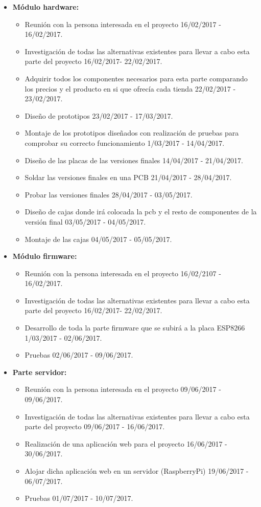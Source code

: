 \begin{itemize}
	\item\textbf{Módulo hardware:}
		\begin{itemize}
			\item Reunión con la persona interesada en el proyecto 16/02/2017 - 16/02/2017. 
			\item Investigación de todas las alternativas existentes para llevar a cabo esta parte del proyecto 16/02/2017- 22/02/2017.
			\item Adquirir todos los componentes necesarios para esta parte comparando los precios y el producto en si que ofrecía cada tienda 22/02/2017 - 23/02/2017.
			\item Diseño de prototipos 23/02/2017 - 17/03/2017.
			\item Montaje de los prototipos diseñados con realización de pruebas para comprobar su correcto funcionamiento 1/03/2017 - 14/04/2017.
			\item Diseño de las placas de las versiones finales 14/04/2017 - 21/04/2017.
			\item Soldar las versiones finales en una PCB 21/04/2017 - 28/04/2017.
			\item Probar las versiones finales 28/04/2017 - 03/05/2017.
			\item Diseño de cajas donde irá colocada la pcb y el resto de componentes de la versión final 03/05/2017 - 04/05/2017.
			\item Montaje de las cajas 04/05/2017 - 05/05/2017.
		\end{itemize}
	\item\textbf{Módulo firmware:}
		\begin{itemize}
			\item Reunión con la persona interesada en el proyecto 16/02/2107 - 16/02/2017. 
			\item Investigación de todas las alternativas existentes para llevar a cabo esta parte del proyecto 16/02/2017- 22/02/2017.
			\item Desarrollo de toda la parte firmware que se subirá a la placa ESP8266 1/03/2017 - 02/06/2017.
			\item Pruebas 02/06/2017 - 09/06/2017.
		\end{itemize}
		\item\textbf{Parte servidor:}
	\begin{itemize}
		\item Reunión con la persona interesada en el proyecto 09/06/2017 - 09/06/2017. 
		\item Investigación de todas las alternativas existentes para llevar a cabo esta parte del proyecto 09/06/2017 - 16/06/2017.
		\item Realización de una aplicación web para el proyecto 16/06/2017 - 30/06/2017.
		\item Alojar dicha aplicación web en un servidor (RaspberryPi) 19/06/2017 - 06/07/2017.
		\item Pruebas 01/07/2017 - 10/07/2017.
	\end{itemize}
\end{itemize}

